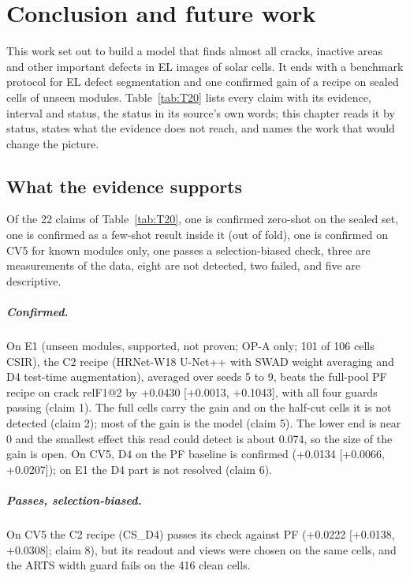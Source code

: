 \chapter{Conclusion and future work}\label{ch:conclusion}

This work set out to build a model that finds almost all cracks, inactive areas and other important defects in EL images of
solar cells. It ends with a benchmark protocol for EL defect segmentation and one confirmed gain of a recipe on sealed cells of
unseen modules. Table~\ref{tab:T20} lists every claim with its evidence, interval and status, the status in its source's own words; this chapter
reads it by status, states what the evidence does not reach, and names the work that would change the picture.

\section{What the evidence supports}\label{sec:concl-claims}

Of the 22 claims of Table~\ref{tab:T20}, one is confirmed zero-shot on the sealed set, one is confirmed as a few-shot result
inside it (out of fold), one is confirmed on CV5 for known modules only, one passes a selection-biased check, three are measurements
of the data, eight are not detected, two failed, and five are descriptive.

\paragraph{Confirmed.} On E1 (unseen modules, supported, not proven; OP-A only; 101 of 106 cells CSIR), the C2 recipe
(HRNet-W18 U-Net++ with SWAD weight averaging and D4 test-time augmentation), averaged over seeds 5 to 9, beats the full-pool PF
recipe on crack relF1@2 by +0.0430 [+0.0013, +0.1043], with all four guards passing (claim 1). The full cells carry the gain and
on the half-cut cells it is not detected (claim 2); most of the gain is the model (claim 5). The lower end is near 0 and the
smallest effect this read could detect is about 0.074, so the size of the gain is open. On CV5, D4 on the PF baseline is confirmed
(+0.0134 [+0.0066, +0.0207]); on E1 the D4 part is not resolved (claim 6).

\paragraph{Passes, selection-biased.} On CV5 the C2 recipe (CS\_D4) passes its check against PF (+0.0222 [+0.0138, +0.0308];
claim 8), but its readout and views were chosen on the same cells, and the ARTS width guard fails on the 416 clean cells.

